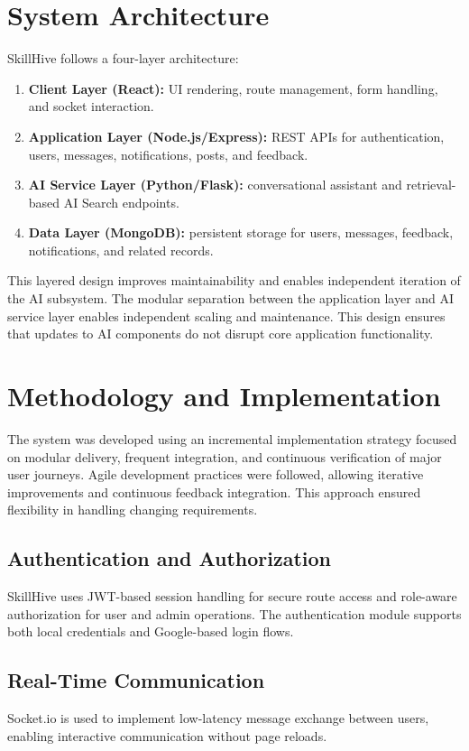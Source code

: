 \documentclass[conference]{IEEEtran}
\begin{document}
\section{System Architecture}
SkillHive follows a four-layer architecture:
\begin{enumerate}
\item \textbf{Client Layer (React):} UI rendering, route management, form handling, and socket interaction.
\item \textbf{Application Layer (Node.js/Express):} REST APIs for authentication, users, messages, notifications, posts, and feedback.
\item \textbf{AI Service Layer (Python/Flask):} conversational assistant and retrieval-based AI Search endpoints.
\item \textbf{Data Layer (MongoDB):} persistent storage for users, messages, feedback, notifications, and related records.
\end{enumerate}

This layered design improves maintainability and enables independent iteration of the AI subsystem. The modular separation between the application layer and AI service layer enables independent scaling and maintenance. This design ensures that updates to AI components do not disrupt core application functionality.

\section{Methodology and Implementation}
The system was developed using an incremental implementation strategy focused on modular delivery, frequent integration, and continuous verification of major user journeys. Agile development practices were followed, allowing iterative improvements and continuous feedback integration. This approach ensured flexibility in handling changing requirements.

\subsection{Authentication and Authorization}
SkillHive uses JWT-based session handling for secure route access and role-aware authorization for user and admin operations. The authentication module supports both local credentials and Google-based login flows.

\subsection{Real-Time Communication}
Socket.io is used to implement low-latency message exchange between users, enabling interactive communication without page reloads.
\end{document}

